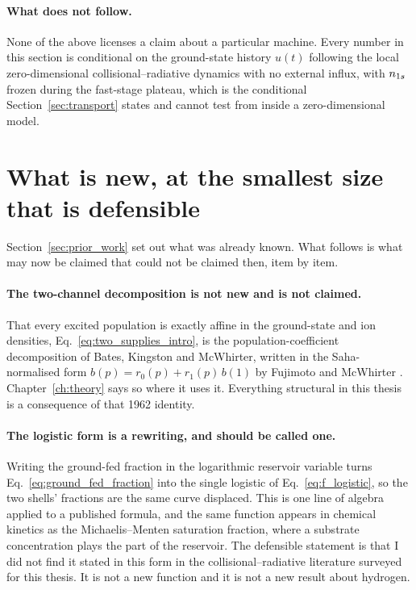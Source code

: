 \paragraph{What does not follow.} None of the above licenses a claim about a
particular machine. Every number in this section is conditional on the
ground-state history $u(t)$ following the local zero-dimensional
collisional--radiative dynamics with no external influx, with $n_{1s}$ frozen
during the fast-stage plateau, which is the conditional
Section~\ref{sec:transport} states and cannot test from inside a
zero-dimensional model.

\section{What is new, at the smallest size that is defensible}
\label{sec:novelty}

Section~\ref{sec:prior_work} set out what was already known. What follows is
what may now be claimed that could not be claimed then, item by item.

\paragraph{The two-channel decomposition is not new and is not claimed.} That
every excited population is exactly affine in the ground-state and ion
densities, Eq.~\eqref{eq:two_supplies_intro}, is the population-coefficient
decomposition of Bates, Kingston and McWhirter, written in the Saha-normalised
form $b(p) = r_0(p) + r_1(p)\,b(1)$ by Fujimoto and McWhirter
\cite{Bates1962, FujimotoMcWhirter1990, Fujimoto2004}. Chapter~\ref{ch:theory}
says so where it uses it. Everything structural in this thesis is a consequence
of that 1962 identity.

\paragraph{The logistic form is a rewriting, and should be called one.} Writing
the ground-fed fraction in the logarithmic reservoir variable turns
Eq.~\eqref{eq:ground_fed_fraction} into the single logistic of
Eq.~\eqref{eq:f_logistic}, so the two shells' fractions are the same curve
displaced. This is one line of algebra applied to a published formula, and the
same function appears in chemical kinetics as the Michaelis--Menten saturation
fraction, where a substrate concentration plays the part of the reservoir. The
defensible statement is that I did not find it stated in this form in the
collisional--radiative literature surveyed for this thesis. It is not a new function and it is not a
new result about hydrogen.

